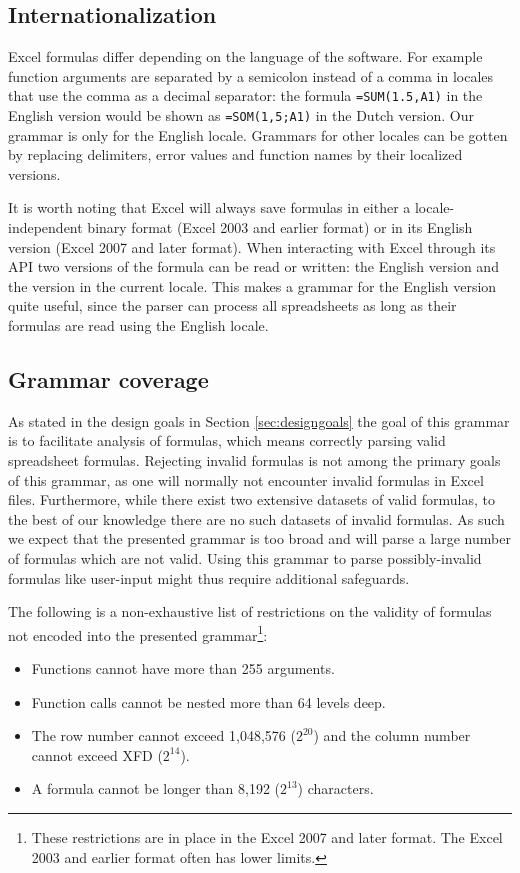 \documentclass[conference]{IEEEtran}
\begin{document}
\subsection{Internationalization}

Excel formulas differ depending on the language of the software. For example function arguments are separated by a semicolon instead of a comma in locales that use the comma as a decimal separator: the formula \texttt{=SUM(1.5,A1)} in the English version would be shown as \texttt{=SOM(1,5;A1)} in the Dutch version.
Our grammar is only for the English locale.
Grammars for other locales can be gotten by replacing delimiters, error values and function names by their localized versions.

It is worth noting that Excel will always save formulas in either a locale-independent binary format (Excel 2003 and earlier format) or in its English version (Excel 2007 and later format). When interacting with Excel through its API two versions of the formula can be read or written: the English version and the version in the current locale.
This makes a grammar for the English version quite useful, since the parser can process all spreadsheets as long as their formulas are read using the English locale.

\subsection{Grammar coverage}

As stated in the design goals in Section \ref{sec:designgoals} the goal of this grammar is to facilitate analysis of formulas, which means correctly parsing valid spreadsheet formulas.
Rejecting invalid formulas is not among the primary goals of this grammar, as one will normally not encounter invalid formulas in Excel files.
Furthermore, while there exist two extensive datasets of valid formulas, to the best of our knowledge there are no such datasets of invalid formulas.
As such we expect that the presented grammar is too broad and will parse a large number of formulas which are not valid.
Using this grammar to parse possibly-invalid formulas like user-input might thus require additional safeguards.

The following is a non-exhaustive list of restrictions on the validity of formulas not encoded into the presented grammar\footnote{These restrictions are in place in the Excel 2007 and later format. The Excel 2003 and earlier format often has lower limits.}:

\begin{itemize}
	\item Functions cannot have more than 255 arguments.
	\item Function calls cannot be nested more than 64 levels deep.
	\item The row number cannot exceed 1,048,576 ($2^{20}$) and the column number cannot exceed XFD ($2^{14}$).
	\item A formula cannot be longer than 8,192 ($2^{13}$) characters.
\end{itemize}
\end{document}
